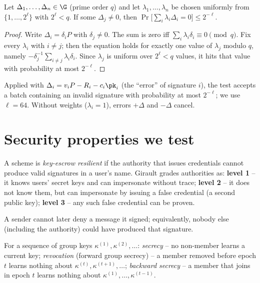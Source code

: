 \begin{lemma}\label{lem:bgr}
Let $\Delta_1,\dots,\Delta_n\in\G$ (prime order $q$) and let $\lambda_1,\dots,\lambda_n$ be chosen uniformly from $\{1,\dots,2^\ell\}$ with $2^\ell<q$.
If some $\Delta_j\neq 0$, then $\Pr\big[\sum_i\lambda_i\Delta_i=0\big]\le 2^{-\ell}$.
\end{lemma}
\begin{proof}
Write $\Delta_i=\delta_iP$ with $\delta_j\neq0$. The sum is zero iff $\sum_i\lambda_i\delta_i\equiv0\pmod q$. Fix every $\lambda_i$ with $i\neq j$; then the
equation holds for exactly one value of $\lambda_j$ modulo $q$, namely $-\delta_j^{-1}\sum_{i\ne j}\lambda_i\delta_i$. Since $\lambda_j$ is uniform over
$2^\ell<q$ values, it hits that value with probability at most $2^{-\ell}$.
\end{proof}
\noindent Applied with $\Delta_i=v_iP-R_i-c_i\pk_i$ (the ``error'' of signature $i$), the test accepts a batch containing an invalid signature with
probability at most $2^{-\ell}$; we use $\ell=64$. Without weights ($\lambda_i=1$), errors $+\Delta$ and $-\Delta$ cancel.

\section{Security properties we test}
\begin{definition}
A scheme is \emph{key-escrow resilient} if the authority that issues credentials cannot produce valid signatures in a user's name. Girault grades
authorities as: \textbf{level 1} -- it knows users' secret keys and can impersonate without trace; \textbf{level 2} -- it does not know them, but can
impersonate by issuing a false credential (a second public key); \textbf{level 3} -- any such false credential can be proven.
\end{definition}

\begin{definition}
A sender cannot later deny a message it signed; equivalently, nobody else (including the authority) could have produced that signature.
\end{definition}

\begin{definition}
For a sequence of group keys $\kappa^{(1)},\kappa^{(2)},\dots$: \emph{secrecy} -- no non-member learns a current key; \emph{revocation} (forward group
secrecy) -- a member removed before epoch $t$ learns nothing about $\kappa^{(t)},\kappa^{(t+1)},\dots$; \emph{backward secrecy} -- a member that joins in
epoch $t$ learns nothing about $\kappa^{(1)},\dots,\kappa^{(t-1)}$.
\end{definition}

